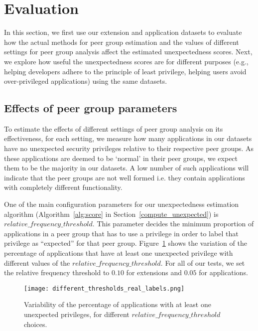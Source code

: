 \section{Evaluation} 
In this section, we first use our \Chrome{} extension and \Android{} application datasets to evaluate 
how the actual methods for peer group estimation and the values of different settings for peer group analysis affect 
the estimated unexpectedness scores. Next, we explore how useful the unexpectedness scores are for 
different purposes (e.g., helping developers adhere to the principle of least privilege, helping users avoid 
over-privileged applications) using the same datasets. 

\subsection{Effects of peer group parameters}
To estimate the effects of different settings of peer group analysis on its effectiveness, 
for each setting, we measure how many applications in our datasets have no unexpected 
security privileges relative to their respective peer groups. As these applications 
are deemed to be `normal' in their peer groups, we expect them to be the majority in our datasets. 
A low number of such applications will indicate that the peer groups are not well formed i.e. they contain 
applications with completely different functionality. 

 One of the main configuration parameters 
for our unexpectedness estimation algorithm (Algorithm~\ref{alg:score} in Section~\ref{compute_unexpected}) 
is $relative\_frequency\allowbreak\_threshold$. This parameter decides the minimum proportion of applications in a peer 
group that has to use a privilege in order to label that privilege as ``expected'' for that peer group. 
Figure~\ref{fig:percentage_different_thresholds} shows the variation of the percentage of applications 
that have at least one unexpected privilege with different values of the $relative\_frequency\_threshold$. 
For all of our tests, we set the relative frequency threshold to $0.10$ for \Chrome{} extensions 
and $0.05$ for \Android{} applications. 

\begin{figure}[!t]
\begin{center}
\texttt{[image: different\_thresholds\_real\_labels.png]}
\caption{Variability of the percentage of applications with at least one unexpected privileges, for different $relative\_frequency\_threshold$ choices.}
\label{fig:percentage_different_thresholds}
\end{center}
\end{figure}

